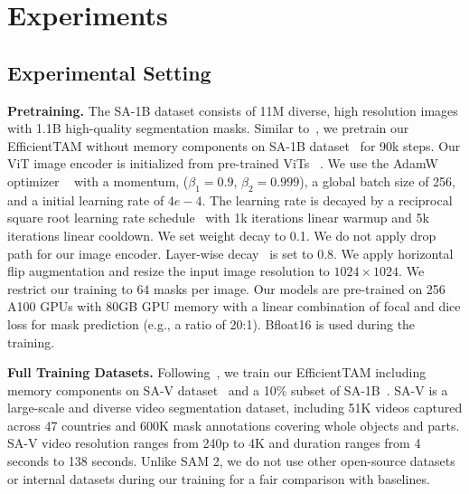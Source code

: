 \section{Experiments}
\subsection{Experimental Setting}
\noindent \textbf{Pretraining.} The SA-1B dataset  consists of 11M diverse, high resolution images with 1.1B high-quality segmentation masks. Similar to~\citep{ravi2024sam}, we pretrain our EfficientTAM without memory components on SA-1B dataset~\citep{kirillov2023segment} for 90k steps. Our ViT image encoder is initialized from pre-trained ViTs~\citep{xiong2024efficientsam}
. We use the AdamW optimizer ~\citep{loshchilov2017decoupled} with a momentum, ($\beta_1 = 0.9$, $\beta_2 = 0.999$), a global batch size of 256, and a initial learning rate of $4e-4$. The learning rate is decayed by a reciprocal square root learning rate schedule~\citep{zhai2022scaling} with 1k iterations linear warmup and 5k iterations linear cooldown. We set weight decay to 0.1. We do not apply drop path for our image encoder. Layer-wise decay~\citep{clark2020electra} is set to 0.8. We apply horizontal flip augmentation and resize the input image resolution to $1024\times 1024$. We restrict our training to $64$ masks per image. Our models are pre-trained on 256 A100 GPUs with 80GB GPU memory with a linear combination of focal and dice loss for mask prediction (e.g., a ratio of 20:1). Bfloat16 is used during the training.

\noindent \textbf{Full Training Datasets.} Following~\citep{ravi2024sam}, we train our EfficientTAM including memory components on SA-V dataset~\citep{ravi2024sam} and a 10\% subset of SA-1B~\citep{kirillov2023segment}. SA-V is a large-scale and diverse video segmentation dataset, including 51K videos captured across 47 countries and 600K mask annotations covering whole objects and parts. SA-V video resolution ranges from 240p to 4K and duration ranges from 4 seconds to 138 seconds. Unlike SAM 2, we do not use other open-source datasets or internal datasets during our training for a fair comparison with baselines. 

